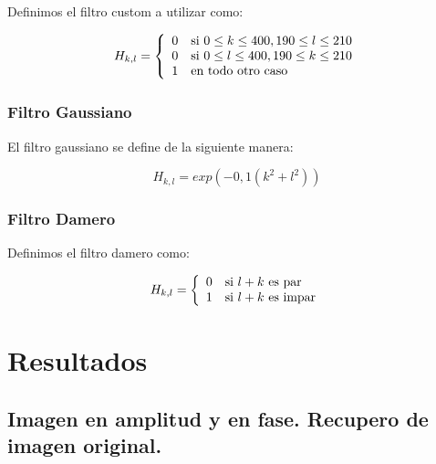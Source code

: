 \documentclass[twocolumn,a4paper,10pt]{article}
\begin{document}
Definimos el filtro custom a utilizar como:

\begin{equation}
    H_{k,l} = \left\{
                    \begin{array}{c l}
                        0 & \mbox{si } 0 \leq k \leq 400, 190 \leq l \leq 210\\
                        0 & \mbox{si } 0 \leq l \leq 400, 190 \leq k \leq 210\\
                        1 & \mbox{en todo otro caso}
                    \end{array}               
               \right.
\end{equation}

\subsubsection{Filtro Gaussiano}

El filtro gaussiano se define de la siguiente manera:

\begin{equation}
    H_{k,l} = exp(-0,1(k^2 + l^2))
\end{equation}


\subsubsection{Filtro Damero}

Definimos el filtro damero como:

\begin{equation}
    H_{k,l} = \left\{
                    \begin{array}{c l}
                        0 & \mbox{si } l+k \mbox{ es par} \\
                        1 & \mbox{si } l+k \mbox{ es impar}
                    \end{array}               
               \right.
\end{equation}

\section{Resultados}
\label{sec:resultados}

\subsection{Imagen en amplitud y en fase. Recupero de imagen original.}
\end{document}
